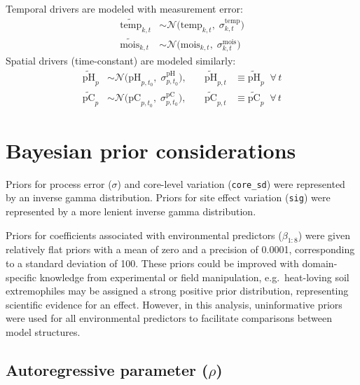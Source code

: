 \documentclass[11pt]{article}
\begin{document}
Temporal drivers are modeled with measurement error:
\begin{align}
\widetilde{\mathrm{temp}}_{k,t} &\sim \mathcal{N}\!\bigl(\mathrm{temp}_{k,t},\; \sigma^{\mathrm{temp}}_{k,t}\bigr) \\
\widetilde{\mathrm{mois}}_{k,t} &\sim \mathcal{N}\!\bigl(\mathrm{mois}_{k,t},\; \sigma^{\mathrm{mois}}_{k,t}\bigr)
\end{align}
Spatial drivers (time-constant) are modeled similarly:
\begin{align}
\widetilde{\mathrm{pH}}_{p} &\sim \mathcal{N}\!\bigl(\mathrm{pH}_{p,t_0},\; \sigma^{\mathrm{pH}}_{p,t_0}\bigr), &\quad \widetilde{\mathrm{pH}}_{p,t} &\equiv \widetilde{\mathrm{pH}}_p \;\;\forall\, t \\
\widetilde{\mathrm{pC}}_{p} &\sim \mathcal{N}\!\bigl(\mathrm{pC}_{p,t_0},\; \sigma^{\mathrm{pC}}_{p,t_0}\bigr), &\quad \widetilde{\mathrm{pC}}_{p,t} &\equiv \widetilde{\mathrm{pC}}_p \;\;\forall\, t
\end{align}


\section{Bayesian prior considerations}

Priors for process error ($\sigma$) and core-level variation (\texttt{core\_sd}) were represented by an inverse gamma distribution. Priors for site effect variation (\texttt{sig}) were represented by a more lenient inverse gamma distribution.

Priors for coefficients associated with environmental predictors ($\beta_{1:8}$) were given relatively flat priors with a mean of zero and a precision of 0.0001, corresponding to a standard deviation of 100. These priors could be improved with domain-specific knowledge from experimental or field manipulation, e.g.\ heat-loving soil extremophiles may be assigned a strong positive prior distribution, representing scientific evidence for an effect. However, in this analysis, uninformative priors were used for all environmental predictors to facilitate comparisons between model structures.

\subsection*{Autoregressive parameter ($\rho$)}
\end{document}

